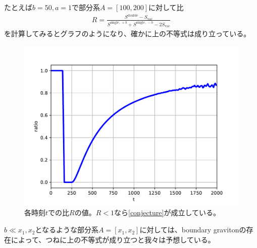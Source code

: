 たとえば$b=50,a=1$で部分系$A=[100,200]$に対して比
\begin{align}
R=\frac{S^\text{double}-S_\text{vac}}{S^{\text{single, }+b}+S^{\text{single, }-b}-2S_\text{vac}}
\end{align}
を計算してみるとグラフのようになり、確かに上の不等式は成り立っている。
\begin{figure}[h]
	\centering
	\includegraphics[width=0.7\linewidth]{DSratio.pdf}
	\caption{各時刻$t$での比$R$の値。$R<1$なら\ref{conjecture}が成立している。}
	\label{fig:dsratio}
\end{figure}

$b\ll x_1,x_2$となるような部分系$A=[x_1,x_2]$に対しては、boundary gravitonの存在によって、つねに上の不等式が成り立つと我々は予想している。